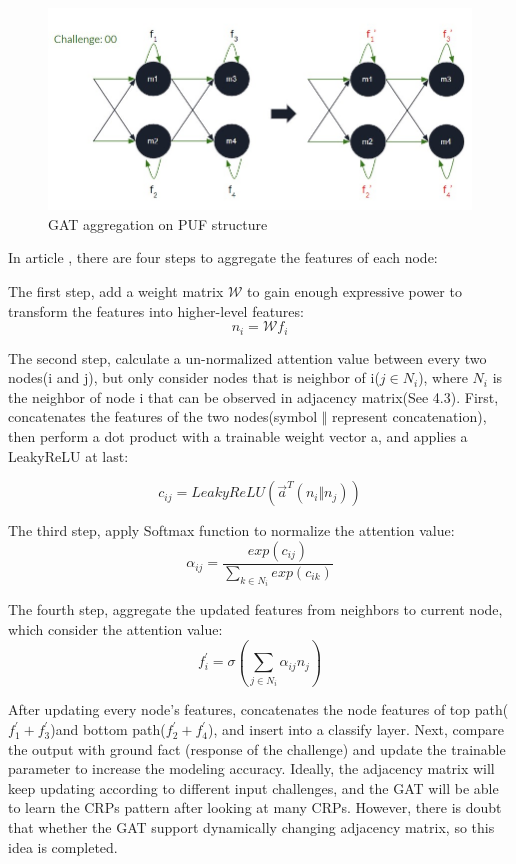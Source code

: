\begin{figure}[htp]
    \centering
    \includegraphics[width=16cm]{figures/figure12.jpg}
    \caption{GAT aggregation on PUF structure}
    \label{fig:figure12}
    \end{figure}

In article \cite{Reference10}, there are four steps to aggregate the features of each node:

The first step, add a weight matrix $\mathcal{W}$ to gain enough expressive power to transform the features into higher-level features:
\begin{equation}
    n_i = \mathcal{W}f_i
\end{equation}

The second step, calculate a un-normalized attention value between every two nodes(i and j), but only consider nodes that is neighbor of i($j \in N_i$), where $N_i$ is the neighbor of node i that can be observed in 
adjacency matrix(See 4.3). First, concatenates the features of the two nodes(symbol $\Vert$ represent concatenation), then perform a dot product with a trainable weight vector a, and applies a LeakyReLU at last:

\begin{equation}
    c_{ij} = LeakyReLU(\overrightarrow{a}^T(n_i \Vert n_j))
\end{equation}

The third step, apply Softmax function to normalize the attention value:
\begin{equation}
    \alpha_{ij} = \frac{exp(c_{ij})}{\sum_{k \in N_i}  exp(c_{ik})} 
\end{equation}

The fourth step, aggregate the updated features from neighbors to current node, which consider the attention value:
\begin{equation}
    f_i^{'} = \sigma (\sum_{j \in N_i} \alpha_{ij}n_j)
\end{equation}

After updating every node's features, concatenates the node features of top path($f_1^{'}+f_3^{'}$)and bottom path($f_2^{'}+f_4^{'}$), and insert into a classify layer. Next, compare the output with ground fact
(response of the challenge) and update the trainable parameter to increase the modeling accuracy. Ideally, the adjacency matrix will keep updating according to different input challenges, and the GAT will be able to 
learn the CRPs pattern after looking at many CRPs. However, there is doubt that whether the GAT support dynamically changing adjacency matrix, so this idea is completed.





